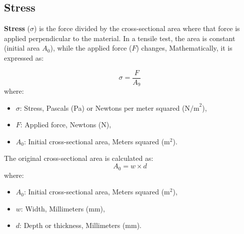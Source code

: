 \documentclass{article}
\begin{document}
     \subsection{Stress}
     \textbf{Stress} ($\sigma$) is the force divided by the cross-sectional area where that force is applied perpendicular to the material. In a tensile test, the area is constant (initial area $A_0$), while the applied force ($F$) changes, Mathematically, it is expressed as:\\[8pt]
            \begin{minipage}{0.48\textwidth}
            \begin{equation}
                \sigma = \frac{F}{A_9}
            \end{equation}
            where:
            \begin{itemize}[left=0pt,itemsep=-1mm]
                \item \( \sigma \): Stress, Pascals (Pa) or Newtons per meter squared (\(\text{N/m}^2\)),
                \item \( F \): Applied force, Newtons (N),
                \item \( A_0 \): Initial cross-sectional area, Meters squared (\(\text{m}^2\)).
            \end{itemize}
        \end{minipage}\hfill
        \begin{minipage}{0.48\textwidth}
            The original cross-sectional area is calculated as:
            \begin{equation}
                A_0 = w \times d
            \end{equation}
            where:
            \begin{itemize}[left=0pt,itemsep=-1mm]
                \item \( A_0 \): Initial cross-sectional area, Meters squared (\(\text{m}^2\)),
                \item \( w \): Width, Millimeters (mm),
                \item \( d \): Depth or thickness, Millimeters (mm).
            \end{itemize}
        \end{minipage}
\end{document}
